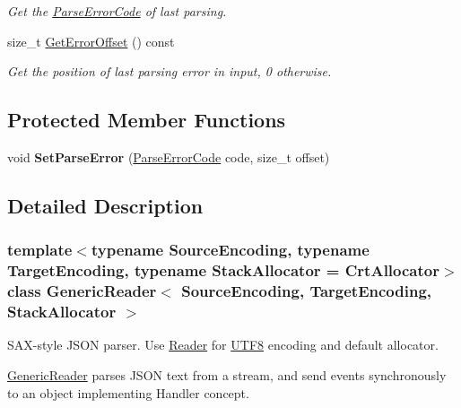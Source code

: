 \begin{DoxyCompactItemize}
\begin{DoxyCompactList}\small\item\em Get the \hyperlink{group___r_a_p_i_d_j_s_o_n___e_r_r_o_r_s_ga8d4b32dfc45840bca189ade2bbcb6ba7}{Parse\+Error\+Code} of last parsing. \end{DoxyCompactList}\item 
\mbox{\label{class_generic_reader_ae9008523ccd06d839a57335835cb4091}} 
size\+\_\+t \hyperlink{class_generic_reader_ae9008523ccd06d839a57335835cb4091}{Get\+Error\+Offset} () const
\begin{DoxyCompactList}\small\item\em Get the position of last parsing error in input, 0 otherwise. \end{DoxyCompactList}\end{DoxyCompactItemize}
\subsection*{Protected Member Functions}
\begin{DoxyCompactItemize}
\item 
\mbox{\label{class_generic_reader_ae50079444295bf109730c3b708a818a6}} 
void {\bfseries Set\+Parse\+Error} (\hyperlink{group___r_a_p_i_d_j_s_o_n___e_r_r_o_r_s_ga8d4b32dfc45840bca189ade2bbcb6ba7}{Parse\+Error\+Code} code, size\+\_\+t offset)
\end{DoxyCompactItemize}


\subsection{Detailed Description}
\subsubsection*{template$<$typename Source\+Encoding, typename Target\+Encoding, typename Stack\+Allocator = Crt\+Allocator$>$\newline
class Generic\+Reader$<$ Source\+Encoding, Target\+Encoding, Stack\+Allocator $>$}

S\+A\+X-\/style J\+S\+ON parser. Use \hyperlink{reader_8h_a84f3b66a66647f4ac4267078359188ba}{Reader} for \hyperlink{struct_u_t_f8}{U\+T\+F8} encoding and default allocator. 

\hyperlink{class_generic_reader}{Generic\+Reader} parses J\+S\+ON text from a stream, and send events synchronously to an object implementing Handler concept.

